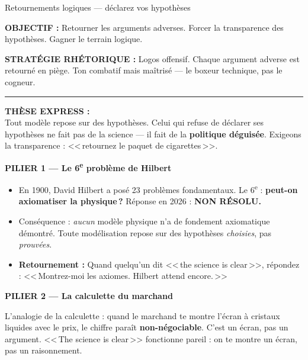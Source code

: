\documentclass[a4paper,11pt]{article}
\begin{document}
\begin{ficheorange}{Retournements logiques --- d\'{e}clarez vos hypoth\`{e}ses}

\textbf{OBJECTIF :} Retourner les arguments adverses. Forcer la transparence des hypoth\`{e}ses. Gagner le terrain logique.

\textbf{STRAT\'{E}GIE RH\'{E}TORIQUE :} Logos offensif. Chaque argument adverse est retourn\'{e} en pi\`{e}ge. Ton combatif mais ma\^{i}tris\'{e} --- le boxeur technique, pas le cogneur.

\rule{\textwidth}{0.3pt}

\textbf{\color{ModeOrange}TH\`{E}SE EXPRESS :}\\
Tout mod\`{e}le repose sur des hypoth\`{e}ses. Celui qui refuse de d\'{e}clarer ses hypoth\`{e}ses ne fait pas de la science --- il fait de la \textbf{politique d\'{e}guis\'{e}e}. Exigeons la transparence : <<\,retournez le paquet de cigarettes\,>>.

\vspace{0.3cm}
\textbf{\color{ModeOrange}PILIER 1 --- Le 6\textsuperscript{e} probl\`{e}me de Hilbert}

\begin{itemize}[nosep, label=\color{ModeOrange}$\blacktriangleright$]
  \item En 1900, David Hilbert a pos\'{e} 23 probl\`{e}mes fondamentaux. Le 6\textsuperscript{e} : \textbf{peut-on axiomatiser la physique\,?} R\'{e}ponse en 2026 : \textbf{NON R\'{E}SOLU.}
  \item Cons\'{e}quence : \emph{aucun} mod\`{e}le physique n'a de fondement axiomatique d\'{e}montr\'{e}. Toute mod\'{e}lisation repose sur des hypoth\`{e}ses \emph{choisies}, pas \emph{prouv\'{e}es}.
  \item \textbf{Retournement :} Quand quelqu'un dit <<\,the science is clear\,>>, r\'{e}pondez : <<\,Montrez-moi les axiomes. Hilbert attend encore.\,>>
\end{itemize}

\vspace{0.3cm}
\textbf{\color{ModeOrange}PILIER 2 --- La calculette du marchand}

L'analogie de la calculette : quand le marchand te montre l'\'{e}cran \`{a} cristaux liquides avec le prix, le chiffre para\^{i}t \textbf{non-n\'{e}gociable}. C'est un \'{e}cran, pas un argument. <<\,The science is clear\,>> fonctionne pareil : on te montre un \'{e}cran, pas un raisonnement.


\end{ficheorange}
\end{document}
